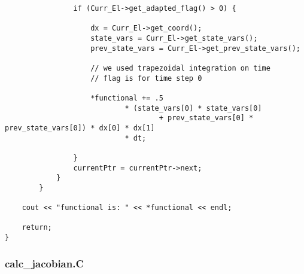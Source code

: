 \documentclass[a4paper,10pt]{article}
\begin{document}
\begin{lstlisting}
				if (Curr_El->get_adapted_flag() > 0) {

					dx = Curr_El->get_coord();
					state_vars = Curr_El->get_state_vars();
					prev_state_vars = Curr_El->get_prev_state_vars();

					// we used trapezoidal integration on time
					// flag is for time step 0

					*functional += .5
							* (state_vars[0] * state_vars[0]
									+ prev_state_vars[0] * prev_state_vars[0]) * dx[0] * dx[1]
							* dt;

				}
				currentPtr = currentPtr->next;
			}
		}

	cout << "functional is: " << *functional << endl;

	return;
}
\end{lstlisting}
\subsubsection{calc\_jacobian.C}
\end{document}
